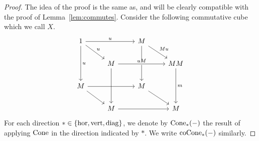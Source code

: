 \begin{proof}
    The idea of the proof is the same as, and will be clearly compatible with the proof of Lemma~\ref{lem:commutes}. Consider the following commutative cube which we call $X$.
    \[\begin{tikzcd}
        1 && M & \\
        & M && MM \\
        M && M & {} \\
        & M && M
        \arrow["u", from=1-1, to=1-3]
        \arrow["u", from=1-1, to=2-2]
        \arrow["u", from=1-1, to=3-1]
        \arrow["Mu", from=1-3, to=2-4]
        \arrow["{{ }}"{description}, from=1-3, to=3-3]
        \arrow["uM", from=2-2, to=2-4]
        \arrow[from=2-2, to=4-2]
        \arrow["m", from=2-4, to=4-4]
        \arrow[from=3-1, to=3-3]
        \arrow[from=3-1, to=4-2]
        \arrow[from=3-3, to=4-4]
        \arrow[from=4-2, to=4-4]
    \end{tikzcd}\]
    For each direction $*\in\{\operatorname{hor},\operatorname{vert},\operatorname{diag}\}$, we denote by $\operatorname{Cone}_*(-)$ the result of applying $\operatorname{Cone}$ in the direction indicated by $*$. We write $\operatorname{coCone}_*(-)$ similarly.


\end{proof}
